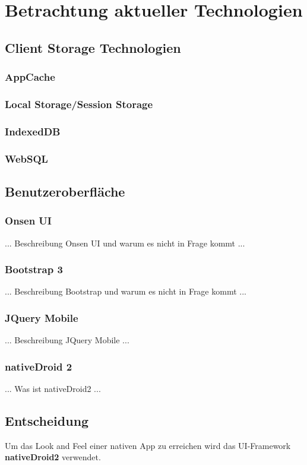 \section{Betrachtung aktueller Technologien}

\subsection{Client Storage Technologien}

\subsubsection{AppCache}

\subsubsection{Local Storage/Session Storage}

\subsubsection{IndexedDB}

\subsubsection{WebSQL}


\subsection{Benutzeroberfläche}

\subsubsection{Onsen UI}

... Beschreibung Onsen UI und warum es nicht in Frage kommt ...

\subsubsection{Bootstrap 3}

... Beschreibung Bootstrap und warum es nicht in Frage kommt ...

\subsubsection{JQuery Mobile}

... Beschreibung JQuery Mobile ...

\subsubsection{nativeDroid 2}

... Was ist nativeDroid2 ...


\subsection{Entscheidung}

Um das \glqq{}Look and Feel\grqq{} einer nativen App zu erreichen wird das UI-Framework \textbf{nativeDroid2} verwendet. \\

